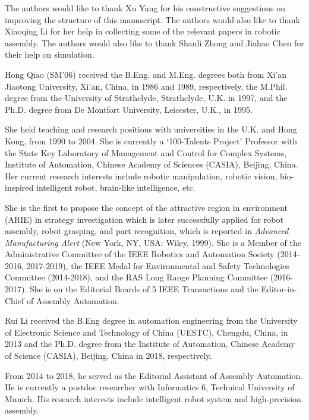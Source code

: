 \documentclass[journal,twoside,web]{ieeecolor}
\begin{document}
The authors would like to thank Xu Yang for his constructive suggestions on improving the structure of this manuscript. The authors would also like to thank Xiaoqing Li for her help in collecting some of the relevant papers in robotic assembly. The authors would also like to thank Shanli Zhong and Jiahao Chen for their help on simulation.





\begin{IEEEbiography}
    {Hong Qiao} (SM'06) received the B.Eng. and M.Eng. degrees both from Xi'an Jiaotong University, Xi’an, China, in 1986 and 1989, respectively, the M.Phil. degree from the University of Strathclyde, Strathclyde, U.K. in 1997, and the Ph.D. degree from De Montfort University, Leicester, U.K., in 1995.
    
    She held teaching and research positions with universities in the U.K. and Hong Kong, from 1990 to 2004. She is currently a `100-Talents Project' Professor with the State Key Laboratory of Management and Control for Complex Systems, Institute of Automation, Chinese Academy of Sciences (CASIA), Beijing, China. Her current research interests include robotic manipulation, robotic vision, bio-inspired intelligent robot, brain-like intelligence, etc.
    
    She is the first to propose the concept of the attractive region in environment (ARIE) in strategy investigation which is later successfully applied for robot assembly, robot grasping, and part recognition, which is reported in \textit{Advanced Manufacturing Alert} (New York, NY, USA: Wiley, 1999). She is a Member of the Administrative Committee of the IEEE Robotics and Automation Society (2014-2016, 2017-2019), the IEEE Medal for Environmental and Safety Technologies Committee (2014-2018), and the RAS Long Range Planning Committee (2016-2017). She is on the Editorial Boards of 5 IEEE Transactions and the Editor-in-Chief of Assembly Automation.
\end{IEEEbiography}
\vfill
\begin{IEEEbiography}{Rui Li}
    received the B.Eng degree in automation engineering from the University of Electronic Science and Technology of China (UESTC), Chengdu, China, in 2013 and the Ph.D. degree from the Institute of Automation, Chinese Academy of Science (CASIA), Beijing, China in 2018, respectively.
    
    From 2014 to 2018, he served as the Editorial Assistant of Assembly Automation. He is currently a postdoc researcher with Informatics 6, Technical University of Munich. His research interests include intelligent robot system and high-precision assembly.
\end{IEEEbiography}
\vfill
\end{document}

